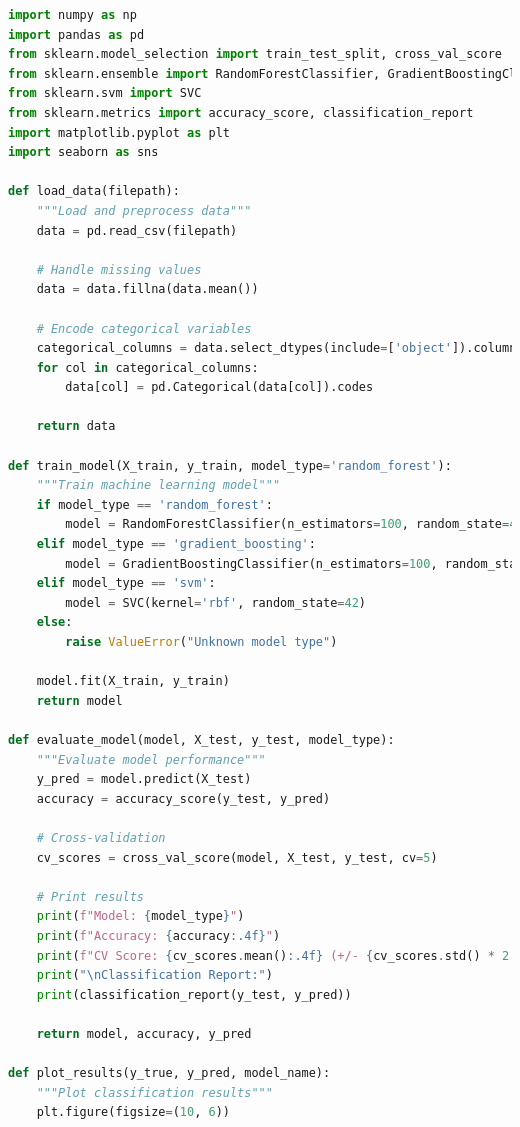 \begin{lstlisting}[style=code, language=Python, caption={Пример алгоритма машинного обучения с улучшенной подсветкой}, label={lst:ml_algorithm_enhanced}]
import numpy as np
import pandas as pd
from sklearn.model_selection import train_test_split, cross_val_score
from sklearn.ensemble import RandomForestClassifier, GradientBoostingClassifier
from sklearn.svm import SVC
from sklearn.metrics import accuracy_score, classification_report
import matplotlib.pyplot as plt
import seaborn as sns

def load_data(filepath):
    """Load and preprocess data"""
    data = pd.read_csv(filepath)
    
    # Handle missing values
    data = data.fillna(data.mean())
    
    # Encode categorical variables
    categorical_columns = data.select_dtypes(include=['object']).columns
    for col in categorical_columns:
        data[col] = pd.Categorical(data[col]).codes
    
    return data

def train_model(X_train, y_train, model_type='random_forest'):
    """Train machine learning model"""
    if model_type == 'random_forest':
        model = RandomForestClassifier(n_estimators=100, random_state=42)
    elif model_type == 'gradient_boosting':
        model = GradientBoostingClassifier(n_estimators=100, random_state=42)
    elif model_type == 'svm':
        model = SVC(kernel='rbf', random_state=42)
    else:
        raise ValueError("Unknown model type")
    
    model.fit(X_train, y_train)
    return model

def evaluate_model(model, X_test, y_test, model_type):
    """Evaluate model performance"""
    y_pred = model.predict(X_test)
    accuracy = accuracy_score(y_test, y_pred)
    
    # Cross-validation
    cv_scores = cross_val_score(model, X_test, y_test, cv=5)
    
    # Print results
    print(f"Model: {model_type}")
    print(f"Accuracy: {accuracy:.4f}")
    print(f"CV Score: {cv_scores.mean():.4f} (+/- {cv_scores.std() * 2:.4f})")
    print("\nClassification Report:")
    print(classification_report(y_test, y_pred))
    
    return model, accuracy, y_pred

def plot_results(y_true, y_pred, model_name):
    """Plot classification results"""
    plt.figure(figsize=(10, 6))
    

\end{lstlisting}
